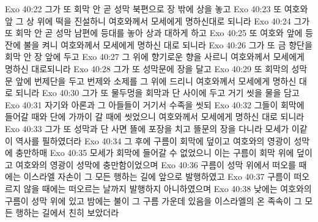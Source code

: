 Exo 40:22  그가 또 회막 안 곧 성막 북편으로 장 밖에 상을 놓고
Exo 40:23  또 여호와 앞 그 상 위에 떡을 진설하니 여호와께서 모세에게 명하신대로 되니라
Exo 40:24  그가 또 회막 안 곧 성막 남편에 등대를 놓아 상과 대하게 하고
Exo 40:25  또 여호와 앞에 등잔에 불을 켜니 여호와께서 모세에게 명하신 대로 되니라
Exo 40:26  그가 또 금 향단을 회막 안 장 앞에 두고
Exo 40:27  그 위에 향기로운 향을 사르니 여호와께서 모세에게 명하신 대로되니라
Exo 40:28  그가 또 성막문에 장을 달고
Exo 40:29  또 회막의 성막 문 앞에 번제단을 두고 번제와 소제를 그 위에 드리니 여호와께서 모세에게 명하신 대로 되니라
Exo 40:30  그가 또 물두멍을 회막과 단 사이에 두고 거기 씻을 물을 담고
Exo 40:31  자기와 아론과 그 아들들이 거기서 수족을 씻되
Exo 40:32  그들이 회막에 들어갈 때와 단에 가까이 갈 때에 씻었으니 여호와께서 모세에게 명하신 대로 되니라
Exo 40:33  그가 또 성막과 단 사면 뜰에 포장을 치고 뜰문의 장을 다니라 모세가 이같이 역사를 필하였더라
Exo 40:34  그 후에 구름이 회막에 덮이고 여호와의 영광이 성막에 충만하매
Exo 40:35  모세가 회막에 들어갈 수 없었으니 이는 구름이 회막 위에 덮이고 여호와의 영광이 성막에 충만함이었으며
Exo 40:36  구름이 성막 위에서 떠오를 때에는 이스라엘 자손이 그 모든 행하는 길에 앞으로 발행하였고
Exo 40:37  구름이 떠오르지 않을 때에는 떠오르는 날까지 발행하지 아니하였으며
Exo 40:38  낮에는 여호와의 구름이 성막 위에 있고 밤에는 불이 그 구름 가운데 있음을 이스라엘의 온 족속이 그 모든 행하는 길에서 친히 보았더라


